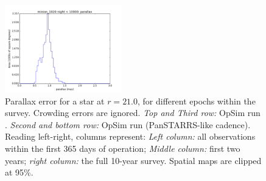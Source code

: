 \begin{figure}[ht]
\begin{center}
  \includegraphics[width=2.0in]{./figs/milkyway/astromPanels/MW_Astrom_paError_PanSTARRS_10y_hst.png}
  \end{center}
  \caption{Parallax error for a star at $r=21.0$, for different epochs within the survey. Crowding errors are ignored. {\it Top and Third row:} OpSim run . {\it Second and bottom row:} OpSim run  (PanSTARRS-like cadence). Reading left-right, columns represent: {\it Left column:} all observations within the first 365 days of operation; {\it Middle column:} first two years; {\it right column:} the full 10-year survey. Spatial maps are clipped at 95\%.}
  \label{fig_astrom_ByTime_paError}
\end{figure}

